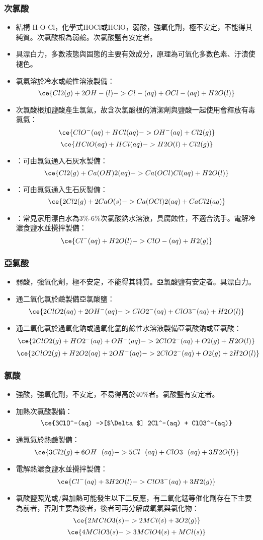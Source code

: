 \documentclass[a4paper,12pt]{report}
\begin{document}
\subsubsection{次氯酸}
\begin{itemize}
\item 結構 H-O-Cl，化學式HOCl或HClO，弱酸，強氧化劑，極不安定，不能得其純質。次氯酸根為弱鹼。次氯酸鹽有安定者。
\item 具漂白力，多數液態與固態的主要有效成分，原理為可氧化多數色素、汙漬使褪色。
\item 氯氣溶於冷水或鹼性溶液製備：
\[\ce{Cl2(g) + 2OH-(l) -> Cl-(aq) + OCl-(aq) + H2O(l)}\]
\item 次氯酸根加鹽酸產生氯氣，故含次氯酸根的清潔劑與鹽酸一起使用會釋放有毒氯氣：
\[\ce{ClO^-(aq) + HCl(aq) -> OH^-(aq) + Cl2(g)}\]
\[\ce{HClO(aq) + HCl(aq) -> H2O(l) + Cl2(g)}\]
\item {}：可由氯氣通入石灰水製備：
\[\ce{Cl2(g) + Ca(OH)2(aq) -> Ca(OCl)Cl(aq) + H2O(l)}\]
\item {}：可由氯氣通入生石灰製備：
\[\ce{2Cl2(g) + 2CaO(s) -> Ca(OCl)2(aq) + CaCl2(aq)}\]
\item {}：常見家用漂白水為3\%-6\%次氯酸鈉水溶液，具腐蝕性，不適合洗手。電解冷濃食鹽水並攪拌製備：
\[\ce{Cl^-(aq) + H2O(l) -> ClO-(aq) + H2(g)}\]
\end{itemize}
\subsubsection{亞氯酸}
\begin{itemize}
\item 弱酸，強氧化劑，極不安定，不能得其純質。亞氯酸鹽有安定者。具漂白力。
\item 通二氧化氯於鹼製備亞氯酸鹽：
\[\ce{2ClO2(aq) + 2OH^-(aq) -> ClO2^-(aq) + ClO3^-(aq) + H2O(l)}\]
\item 通二氧化氯於過氧化鈉或過氧化氫的鹼性水溶液製備亞氯酸鈉或亞氯酸：
\[\ce{2ClO2(g) + HO2^-(aq) + OH^-(aq) -> 2ClO2^-(aq) + O2(g) + H2O(l)}\]
\[\ce{2ClO2(g) + H2O2(aq) + 2OH^-(aq) -> 2ClO2^-(aq) + O2(g) + 2H2O(l)}\]
\end{itemize}
\subsubsection{氯酸}
\begin{itemize}
\item 強酸，強氧化劑，不安定，不易得高於40\%者。氯酸鹽有安定者。
\item 加熱次氯酸製備：
\[\ce{3ClO^-(aq) ->[$\Delta$] 2Cl^-(aq) + ClO3^-(aq)}\]
\item 通氯氣於熱鹼製備：
\[\ce{3Cl2(g) + 6OH^-(aq) -> 5Cl^-(aq) + ClO3^-(aq) + 3H2O(l)}\]
\item 電解熱濃食鹽水並攪拌製備：
\[\ce{Cl^-(aq) + 3H2O(l) -> ClO3^-(aq) + 3H2(g)}\]
\item 氯酸鹽照光或/與加熱可能發生以下二反應，有二氧化錳等催化劑存在下主要為前者，否則主要為後者，後者可再分解成氧氣與氯化物：
\[\ce{2MClO3(s) -> 2MCl(s) + 3O2(g)}\]
\[\ce{4MClO3(s) -> 3MClO4(s) + MCl(s)}\]
\end{itemize}
\end{document}
